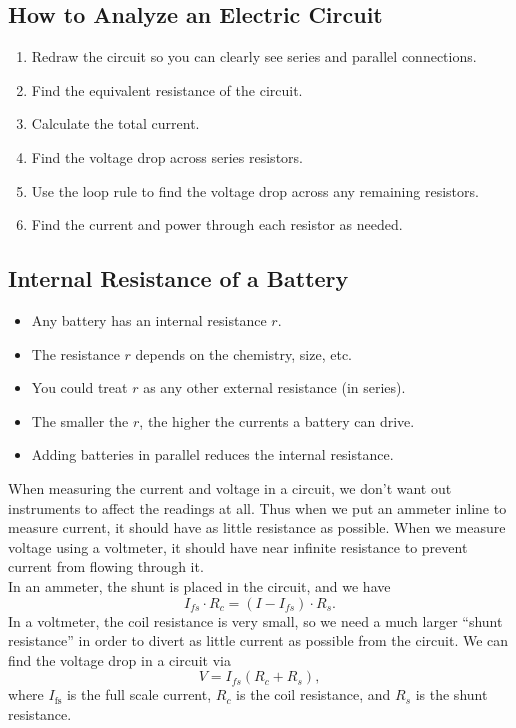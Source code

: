\documentclass[class=article, crop=false]{standalone}
\begin{document}
  \subsection{How to Analyze an Electric Circuit}
  \begin{enumerate}
    \item Redraw the circuit so you can clearly see series and parallel connections.
    \item Find the equivalent resistance of the circuit.
    \item Calculate the total current.
    \item Find the voltage drop across series resistors.
    \item Use the loop rule to find the voltage drop across any remaining resistors.
    \item Find the current and power through each resistor as needed.
  \end{enumerate}
  \subsection{Internal Resistance of a Battery}
  \begin{itemize}
    \item Any battery has an internal resistance $r$.
    \item The resistance $r$ depends on the chemistry, size, etc.
    \item You could treat $r$ as any other external resistance (in series).
    \item The smaller the $r$, the higher the currents a battery can drive.
    \item Adding batteries in parallel reduces the internal resistance.
  \end{itemize}
  When measuring the current and voltage in a circuit, we don't want out instruments to affect the readings at all. Thus when we put an ammeter inline to measure current, it should have as little resistance as possible. When we measure voltage using a voltmeter, it should have near infinite resistance to prevent current from flowing through it. \\[10pt]
  In an ammeter, the shunt is placed in the circuit, and we have
  \[
    I_{fs}\cdot R_c = (I - I_{fs})\cdot R_s.
  \]
  In a voltmeter, the coil resistance is very small, so we need a much larger ``shunt resistance'' in order to divert as little current as possible from the circuit. We can find the voltage drop in a circuit via
  \[
    V = I_{fs}(R_c + R_s),
  \]
  where $I_{\text{fs}}$ is the full scale current, $R_c$ is the coil resistance, and $R_s$ is the shunt resistance.
\end{document}
